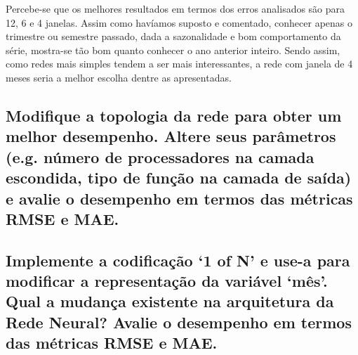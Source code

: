 \documentclass[12pt]{article}
\begin{document}
	Percebe-se que os melhores resultados em termos dos erros analisados são para 12, 6 e 4 janelas. Assim como havíamos suposto e comentado, conhecer apenas o trimestre ou semestre passado, dada a sazonalidade e bom comportamento da série, mostra-se tão bom quanto conhecer o ano anterior inteiro. Sendo assim, como redes mais simples tendem a ser mais interessantes, a rede com janela de 4 meses seria a melhor escolha dentre as apresentadas.
	
	\subsection{Modifique a topologia da rede para obter um melhor desempenho. Altere seus parâmetros (e.g. número de processadores na camada escondida, tipo de função na camada de saída) e avalie o desempenho em termos das métricas RMSE e MAE.}
	
	\subsection{Implemente a codificação ‘1 of N’ e use-a para modificar a representação da variável ‘mês’. Qual a mudança existente na arquitetura da Rede	Neural? Avalie o desempenho em termos das métricas RMSE e MAE.}
	

	 
	
\end{document}
